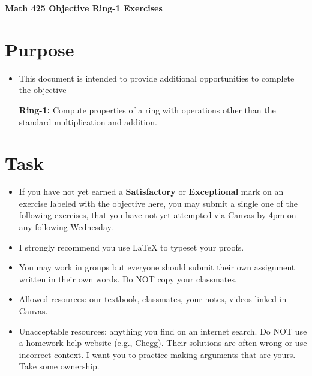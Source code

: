 \documentclass[12pt]{article}
\begin{document}
	\begin{center}
		{\Large \bf Math 425 Objective Ring-1 Exercises}
	\end{center}
	\section*{Purpose}
	\begin{itemize}
		\item This document is intended to provide additional opportunities to complete the objective
		
		\textbf{Ring-1:}  Compute properties of a ring with operations other than the standard multiplication and addition.
	\end{itemize}
	\section*{Task}
	\begin{itemize}
		\item If you have not yet earned a \textbf{Satisfactory} or \textbf{Exceptional} mark on an exercise labeled with the objective here, you may submit a single one of the following exercises, that you have not yet attempted via Canvas by 4pm on any following Wednesday.
		\item I strongly recommend you use LaTeX to typeset your proofs.
		\item You may work in groups but everyone should submit their own assignment written in their own words.  Do NOT copy your classmates.
		\item Allowed resources: our textbook, classmates, your notes, videos linked in Canvas.
		\item Unacceptable resources: anything you find on an internet search. Do NOT use a homework help website (e.g., Chegg). Their solutions are often wrong or use incorrect context.  I want you to practice making arguments that are yours. Take some ownership.
	\end{itemize}
\end{document}
